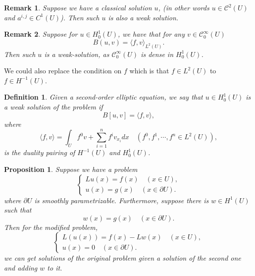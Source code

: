 \documentclass{article}
\newtheorem{proposition}{Proposition}[section]
\newtheorem{definition}{Definition}[section]
\newtheorem{remark}{Remark}[section]
\numberwithin{equation}{section}
\begin{document}
\begin{remark}
Suppose we have a classical solution $u$, (in other words $u\in\mathcal{C}^2(U)$ and $a^{i,j}\in C^1(U)$). Then such $u$ is also a weak solution. 
\end{remark}

\begin{remark}
Suppose for $u\in H_0^1(U)$, we have that for any $v\in\mathcal{C}_0^\infty(U)$
\begin{equation*}
B(u,v) = \langle f,v\rangle_{L^2(U)}.
\end{equation*}
Then such $u$ is a weak-solution, as $\mathcal{C}_0^\infty(U)$ is dense in $H_0^1(U)$.
\end{remark}

We could also replace the condition on $f$ which is that $f\in L^2(U)$ to $f\in H^{-1}(U)$. 

\begin{definition}
Given a second-order elliptic equation, we say that $u\in H_0^1(U)$ is a weak solution of the problem if
\begin{equation*}
B[u,v]=\langle f,v\rangle,
\end{equation*}
where
\begin{equation*}
\langle f,v\rangle = \int_U f^0v+\sum_{i=1}^n f^iv_{x_i}dx\quad(f^0,f^1,\cdots,f^n\in L^2(U)),
\end{equation*}
is the duality pairing of $H^{-1}(U)$ and $H_0^1(U)$.
\end{definition}

\begin{proposition}
\par Suppose we have a problem
\begin{equation*}
\begin{cases}
Lu(x) = f(x)\quad(x\in U),\\
u(x) = g(x)\quad(x\in\partial U).
\end{cases}
\end{equation*}
where $\partial U$ is smoothly parametrizable. Furthermore, suppose there is $w\in H^1(U)$ such that 
\begin{equation*}
w(x) = g(x) \quad (x\in\partial U).
\end{equation*}
Then for the modified problem,
\begin{equation*}
\begin{cases}
L(u(x)) = f(x)-Lw(x)\quad(x\in U),\\
u(x) = 0\quad(x\in\partial U).
\end{cases}
\end{equation*}
we can get solutions of the original problem given a solution of the second one and adding $w$ to it.
\end{proposition}
\end{document}

